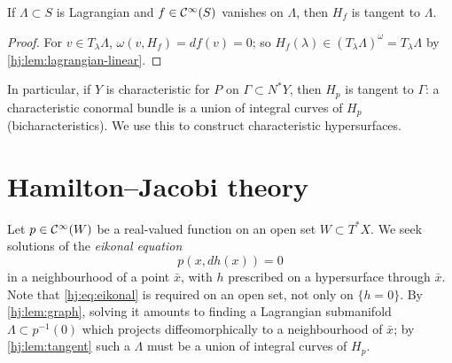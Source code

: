 \begin{lemma}\label{hj:lem:tangent}
  If $\Lambda\subset S$ is Lagrangian and $f\in\mathcal{C}^\infty(S)$ vanishes on $\Lambda$,
  then $H_f$ is tangent to $\Lambda$.
\end{lemma}
\begin{proof}
  For $v\in T_\lambda\Lambda$, $\omega(v,H_f)=df(v)=0$; so
  $H_f(\lambda)\in(T_\lambda\Lambda)^\omega=T_\lambda\Lambda$ by
  \cref{hj:lem:lagrangian-linear}.
\end{proof}

In particular, if $Y$ is characteristic for $P$ on $\Gamma\subset N^*Y$, then
$H_p$ is tangent to $\Gamma$: a characteristic conormal bundle is a union of
integral curves of $H_p$ (bicharacteristics).  We use this to construct
characteristic hypersurfaces.

\section{Hamilton--Jacobi theory}\label{hj:sec:HJ}

Let $p\in\mathcal{C}^\infty(W)$ be a real-valued function on an open set $W\subset T^*X$.  We
seek solutions of the \emph{eikonal equation}
\begin{equation}\label{hj:eq:eikonal}
  p(x,dh(x))=0
\end{equation}
in a neighbourhood of a point $\bar x$, with $h$ prescribed on a hypersurface
through $\bar x$.  Note that \eqref{hj:eq:eikonal} is required on an open set,
not only on $\{h=0\}$.  By \cref{hj:lem:graph}, solving it amounts to finding a
Lagrangian submanifold $\Lambda\subset p^{-1}(0)$ which projects
diffeomorphically to a neighbourhood of $\bar x$; by \cref{hj:lem:tangent} such
a $\Lambda$ must be a union of integral curves of $H_p$.

